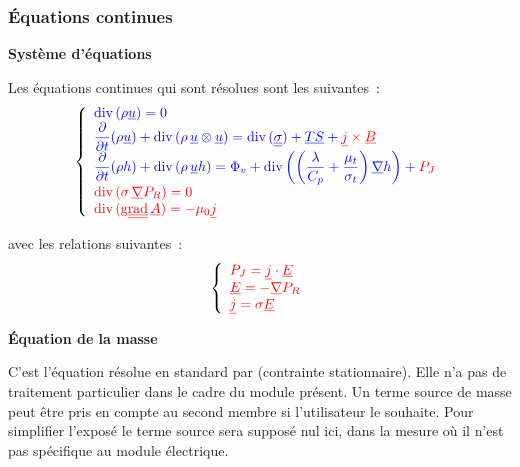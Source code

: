 \subsubsection*{\'Equations continues}

{\bf Syst\`eme d'\'equations}
\nopagebreak

Les \'equations continues qui sont r\'esolues sont les suivantes~:
\begin{equation}
\left\{\begin{array}{l}
{\color{blue}\text{div}\,(\rho \underline{u}) = 0}\\
{\color{blue}\displaystyle\frac{\partial}{\partial t}(\rho \underline{u})
+\text{div}\,(\rho\, \underline{u} \otimes \underline{u})
=\text{div}\,(\underline{\underline{\sigma}}) + \underline{TS} + {\color{red}\underline{j} \times \underline{B}}}\\
{\color{blue}\displaystyle\frac{\partial}{\partial t}(\rho h)
+\text{div}\,(\rho\, \underline{u} h)
=\Phi_v +
\text{div}\,{\left(\left(\frac{\lambda}{C_p}+\frac{\mu_t}{\sigma_t}\right)\underline{\nabla}{h}\right)}
+ {\color{red}P_J}}\\
{\color{red}\text{div}\,(\sigma\,\underline{\nabla}{P_R})=0}\\
{\color{red}\text{div}\,(\text{g}\underline{\underline{{\text{rad}}}}\,{\underline{A}})=-\mu_0\underline{j}}
\end{array}\right.
\end{equation}

avec les relations suivantes~:
\begin{equation}
\left\{\begin{array}{l}
{\color{red}P_J=\underline{j}\cdot\underline{E}}\\
{\color{red}\underline{E}=-\underline{\nabla}{P_R}}\\
{\color{red}\underline{j}=\sigma\underline{E}}\\
\end{array}\right.
\end{equation}


\vspace*{0,5cm}
{\bf \'Equation de la masse}
\nopagebreak

C'est l'\'equation r\'esolue en standard par \CS (contrainte
stationnaire).
Elle n'a pas de traitement particulier dans
le cadre du module pr\'esent. Un terme source de  masse peut \^etre pris en
compte au second membre si l'utilisateur le souhaite. Pour simplifier l'expos\'e
le terme source sera suppos\'e nul ici, dans la mesure o\`u il n'est pas
sp\'ecifique au module \'electrique.

